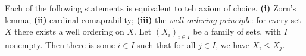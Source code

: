  Each of the following statements is equivalent to teh axiom of choice. \textbf{(i)} Zorn's lemma; \textbf{(ii)} cardinal comaprability; \textbf{(iii)} the \textit{well ordering principle}: for every set $X$ there exists a well ordering on $X$.
 Let $(X_i)_{i \in I}$ be a family of sets, with $I$ nonempty. Then there is some $i \in I$ such that for all $j \in I$, we have $X_i \leq X_j$.
